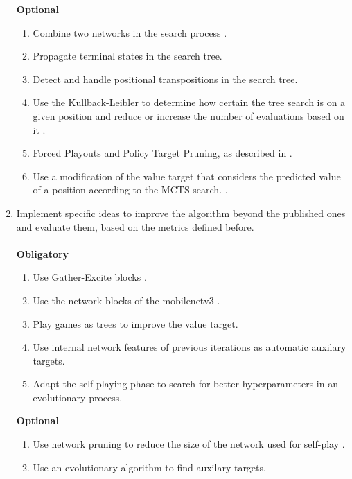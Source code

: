 \documentclass[12pt,onecolumn,oneside,titlepage]{article}
\begin{document}
\begin{enumerate}
 \textbf{Optional}
\begin{enumerate}
  \item Combine two networks in the search process \cite{lan2019multiple}.
  \item Propagate terminal states in the search tree.
  \item Detect and handle positional transpositions in the search tree.
  \item Use the Kullback-Leibler to determine how certain the tree search is on a given position and reduce or increase the number of evaluations based on it \cite{leela0kldgain}.
  \item Forced Playouts and Policy Target Pruning, as described in \cite{wu2019accelerating}.
  \item Use a modification of the value target that considers the predicted value of a position according to the MCTS search. \cite{oracledevs6}.
\end{enumerate}

\pagebreak

 \item Implement specific ideas to improve the algorithm beyond the published ones and evaluate them, based on the metrics defined before.
 \\\\
 \textbf{Obligatory}
\begin{enumerate}
  \item Use Gather-Excite blocks \cite{DBLP:journals/corr/abs-1810-12348}.
  \item Use the network blocks of the mobilenetv3 \cite{howard2019searching}.
  \item Play games as trees to improve the value target.
  \item Use internal network features of previous iterations as automatic auxilary targets.
  \item Adapt the self-playing phase to search for better hyperparameters in an evolutionary process.
\end{enumerate}
 \textbf{Optional}
\begin{enumerate}
  \item Use network pruning to reduce the size of the network used for self-play \cite{DBLP:journals/corr/MolchanovTKAK16}. 
  \item Use an evolutionary algorithm to find auxilary targets.
\end{enumerate}

 
\end{enumerate}
\end{document}
